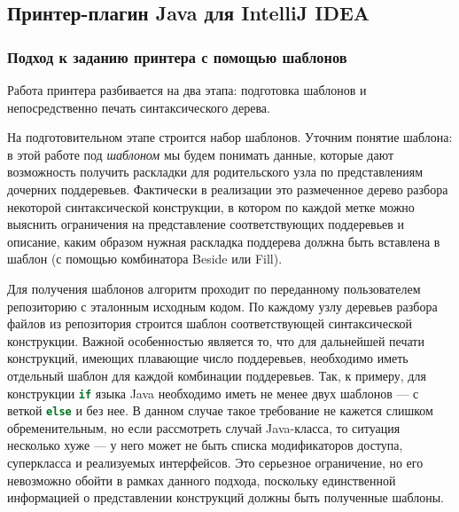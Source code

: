 \newpage
\subsection{Принтер-плагин Java для IntelliJ IDEA}

\subsubsection{Подход к заданию принтера с помощью шаблонов}
Работа принтера разбивается на два этапа: подготовка шаблонов и непосредственно
печать синтаксического дерева.

На подготовительном этапе строится набор шаблонов.
Уточним понятие шаблона: в этой работе под \emph{шаблоном} мы будем
понимать данные, которые дают возможность получить раскладки для родительского
узла по представлениям дочерних поддеревьев.
Фактически в реализации это размеченное дерево разбора
некоторой синтаксической конструкции, в котором по каждой метке можно выяснить
ограничения на представление соответствующих поддеревьев и описание, каким
образом нужная раскладка поддерева должна быть вставлена в шаблон (с помощью
комбинатора Beside или Fill).

Для получения шаблонов алгоритм проходит по переданному пользователем репозиторию с
эталонным исходным кодом. По каждому узлу деревьев разбора файлов из репозитория
строится шаблон соответствующей синтаксической конструкции. Важной особенностью
является то, что для дальнейшей печати конструкций, имеющих плавающие число
поддеревьев, необходимо иметь отдельный шаблон для каждой комбинации поддеревьев.
Так, к примеру, для конструкции \lstinline[language = Java]{if} языка Java
необходимо иметь не менее двух шаблонов --- с веткой \lstinline[language = Java]{else}
и без нее. В данном случае такое требование не кажется слишком обременительным, но
если рассмотреть случай Java-класса, то ситуация несколько хуже --- у него может не
быть списка модификаторов доступа, суперкласса и реализуемых интерфейсов.
Это серьезное ограничение, но его невозможно обойти в рамках данного подхода,
поскольку единственной информацией о представлении конструкций должны быть
полученные шаблоны.

